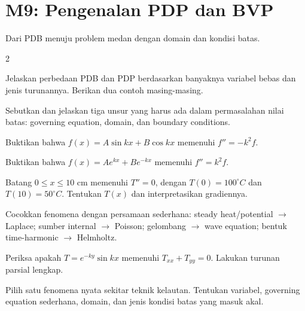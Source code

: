 \documentclass[10pt,a4paper]{article}
\newcommand{\level}[1]{\colorbox{levelbg}{\scriptsize\strut #1}}
\newcommand{\src}[1]{\colorbox{sourcebg}{\scriptsize\strut #1}}
\begin{document}
\section*{M9: Pengenalan PDP dan BVP}
{\color{iteraGray}\small Dari PDB menuju problem medan dengan domain dan kondisi batas.}\par\vspace{1mm}
\begin{multicols}{2}
\begin{qbox}[title={M9.1: PDB vs PDP\hfill \level{L1}\;\src{PR}}]
\small Jelaskan perbedaan PDB dan PDP berdasarkan banyaknya variabel bebas dan jenis turunannya. Berikan dua contoh masing-masing.
\end{qbox}
\begin{qbox}[title={M9.2: Tiga unsur BVP\hfill \level{L1}\;\src{PR}}]
\small Sebutkan dan jelaskan tiga unsur yang harus ada dalam permasalahan nilai batas: governing equation, domain, dan boundary conditions.
\end{qbox}
\begin{qbox}[title={M9.3: Verifikasi solusi sinus\hfill \level{L2}\;\src{PR}}]
\small Buktikan bahwa $f(x)=A\sin kx+B\cos kx$ memenuhi $f''=-k^2f$.
\end{qbox}
\begin{qbox}[title={M9.4: Verifikasi solusi eksponensial\hfill \level{L2}\;\src{PR}}]
\small Buktikan bahwa $f(x)=Ae^{kx}+Be^{-kx}$ memenuhi $f''=k^2f$.
\end{qbox}
\begin{qbox}[title={M9.5: Batang suhu 1D\hfill \level{L2}\;\src{PR}}]
\small Batang $0\le x\le10$ cm memenuhi $T''=0$, dengan $T(0)=100^\circ C$ dan $T(10)=50^\circ C$. Tentukan $T(x)$ dan interpretasikan gradiennya.
\end{qbox}
\begin{qbox}[title={M9.6: Klasifikasi PDE\hfill \level{L2}\;\src{Var}}]
\small Cocokkan fenomena dengan persamaan sederhana: steady heat/potential $\to$ Laplace; sumber internal $\to$ Poisson; gelombang $\to$ wave equation; bentuk time-harmonic $\to$ Helmholtz.
\end{qbox}
\begin{qbox}[title={M9.7: Cek kandidat solusi 2D\hfill \level{L3}\;\src{Var}}]
\small Periksa apakah $T=e^{-ky}\sin kx$ memenuhi $T_{xx}+T_{yy}=0$. Lakukan turunan parsial lengkap.
\end{qbox}
\begin{qbox}[title={M9.8: Dari fenomena ke BVP\hfill \level{L3}\;\src{PR}}]
\small Pilih satu fenomena nyata sekitar teknik kelautan. Tentukan variabel, governing equation sederhana, domain, dan jenis kondisi batas yang masuk akal.
\end{qbox}
\end{multicols}
\newpage
\end{document}
